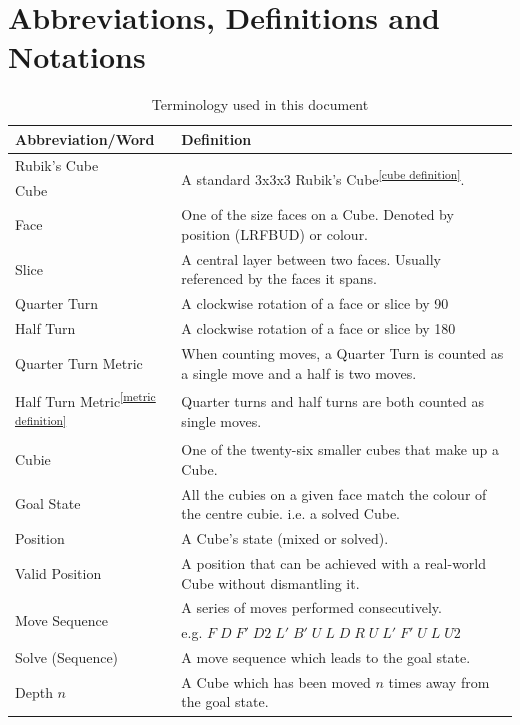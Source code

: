 \documentclass{report}
\begin{document}
	\section*{Abbreviations, Definitions and Notations}
	\begin{table}[htbp]
		\def\arraystretch{1.2}
		\centering
		\caption{Terminology used in this document}
		\label{tab:table1}
		\begin{tabular}{m{}m{}}
			\toprule
			\textbf{Abbreviation/Word} & \textbf{Definition} \\
			\midrule
			Rubik's Cube 		& 	\multirow{ 2}{*}{A standard 3x3x3 Rubik's Cube\textsuperscript{\ref{cube definition}}.} \\
			Cube 				& 	\\
			Face 				& 	One of the size faces on a Cube. Denoted by position (LRFBUD) or colour.\\
			Slice				&	A central layer between two faces. Usually referenced by the faces it spans. \\
			Quarter Turn		&	A clockwise rotation of a face or slice by 90\degree \\
			Half Turn			&	A clockwise rotation of a face or slice by 180\degree \\
			Quarter Turn Metric	&	When counting moves, a Quarter Turn is counted as a single move and a half is two moves. \\
			Half Turn Metric\textsuperscript{\ref{metric definition}}	&	Quarter turns and half turns are both counted as single moves. \\
			Cubie				&	One of the twenty-six smaller cubes that make up a Cube. \\
			Goal State			&	All the cubies on a given face match the colour of the centre cubie. i.e. a solved Cube. \\
			Position			&	A Cube's state (mixed or solved). \\
			Valid Position		&	A position that can be achieved with a real-world Cube without dismantling it. \\
			\multirow{ 2}{*}{Move Sequence}		&	A series of moves performed consecutively. \\
			&	e.g. $F\;D\;F'\;D2\;L'\;B'\;U\;L\;D\;R\;U\;L'\;F'\;U\;L\;U2$ \\
			Solve (Sequence) 	&	A move sequence which leads to the goal state. \\
			Depth $n$			&	A Cube which has been moved $n$ times away from the goal state. \\
			\bottomrule
		\end{tabular}
	\end{table}
\end{document}
